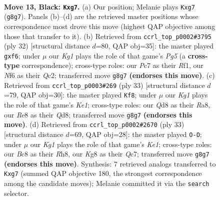 \documentclass[11pt]{article}
\begin{document}
\clearpage

\begin{figure}[p]\centering
\begin{subfigure}{0.46\textwidth}\centering
\resizebox{\linewidth}{!}{%
\newchessgame
\chessboard[
  setfen={1rbqr1k1/p1p2pPp/2pp1n2/4p3/P3P3/2PP1N2/2P2PP1/R1BQ1RK1 b - - 0 13},
  showmover=false,
  pgfstyle=straightmove, color=movearrow, markmove={g8-g7}
]}
\caption{}
\end{subfigure}\hfill
\begin{subfigure}{0.46\textwidth}\centering
\resizebox{\linewidth}{!}{%
\newchessgame
\chessboard[
  setfen={r2q1rk1/p1pbn1pp/4pp2/6P1/2pPNP2/5N2/PPQ4P/2KR1R2 w - - 0 17},
  showmover=false,
  pgfstyle=straightmove, color=movearrow, markmove={g5-f6}
]}
\caption{}
\end{subfigure}
\\[4pt]
\begin{subfigure}{0.46\textwidth}\centering
\resizebox{\linewidth}{!}{%
\newchessgame
\chessboard[
  setfen={r2qk2r/pp2bp2/1np5/3p1B1p/3P2p1/2N1P1P1/PPQ2PP1/4RRK1 b kq - 0 17},
  showmover=false,
  pgfstyle=straightmove, color=movearrow, markmove={e8-f8}
]}
\caption{}
\end{subfigure}\hfill
\begin{subfigure}{0.46\textwidth}\centering
\resizebox{\linewidth}{!}{%
\newchessgame
\chessboard[
  setfen={2r1k2r/1pq1bpp1/p2ppn2/7p/2PNP2P/4BP2/PP1Q2P1/1K1R1R2 b k - 0 17},
  showmover=false,
  pgfstyle=straightmove, color=movearrow, markmove={e8-g8}
]}
\caption{}
\end{subfigure}
\caption{\textbf{Move 13, Black: \texttt{Kxg7}.} (a) Our position; Melanie plays \texttt{Kxg7} (\texttt{g8g7}). Panels (b)--(d) are the retrieved master positions whose correspondence most drove this move (highest QAP objective among those that transfer to it). (b) Retrieved from \texttt{ccrl\_top\_p0002\#3795} (ply 32) [structural distance $d$=80, QAP obj=35]: the master played \texttt{gxf6}; under $\mu$ our \emph{Kg1} plays the role of that game's \emph{Pg5} (a \textbf{cross-type} correspondence); cross-type roles: our \emph{P}c7 as their \emph{R}f1, our \emph{N}f6 as their \emph{Q}c2; transferred move \texttt{g8g7} \textbf{(endorses this move)}. (c) Retrieved from \texttt{ccrl\_top\_p0003\#269} (ply 33) [structural distance $d$=79, QAP obj=30]: the master played \texttt{Kf8}; under $\mu$ our \emph{Kg1} plays the role of that game's \emph{Ke1}; cross-type roles: our \emph{Q}d8 as their \emph{R}a8, our \emph{R}e8 as their \emph{Q}d8; transferred move \texttt{g8g7} \textbf{(endorses this move)}. (d) Retrieved from \texttt{ccrl\_top\_p0002\#2670} (ply 33) [structural distance $d$=69, QAP obj=28]: the master played \texttt{O-O}; under $\mu$ our \emph{Kg1} plays the role of that game's \emph{Ke1}; cross-type roles: our \emph{B}c8 as their \emph{R}h8, our \emph{K}g8 as their \emph{Q}c7; transferred move \texttt{g8g7} \textbf{(endorses this move)}. Synthesis: 7 retrieved analogs transferred to \texttt{Kxg7} (summed QAP objective 180, the strongest correspondence among the candidate moves); Melanie committed it via the \texttt{search} selector.}
\label{fig:thought-m25}
\end{figure}
\end{document}
